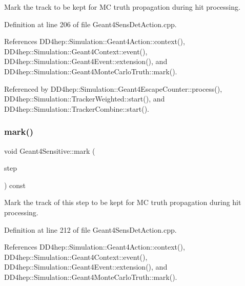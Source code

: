 Mark the track to be kept for MC truth propagation during hit processing. 



Definition at line 206 of file Geant4\+Sens\+Det\+Action.\+cpp.



References D\+D4hep\+::\+Simulation\+::\+Geant4\+Action\+::context(), D\+D4hep\+::\+Simulation\+::\+Geant4\+Context\+::event(), D\+D4hep\+::\+Simulation\+::\+Geant4\+Event\+::extension(), and D\+D4hep\+::\+Simulation\+::\+Geant4\+Monte\+Carlo\+Truth\+::mark().



Referenced by D\+D4hep\+::\+Simulation\+::\+Geant4\+Escape\+Counter\+::process(), D\+D4hep\+::\+Simulation\+::\+Tracker\+Weighted\+::start(), and D\+D4hep\+::\+Simulation\+::\+Tracker\+Combine\+::start().

\hypertarget{class_d_d4hep_1_1_simulation_1_1_geant4_sensitive_a3a5b62f53f7a9c9a07910716cc85e3aa}{}\label{class_d_d4hep_1_1_simulation_1_1_geant4_sensitive_a3a5b62f53f7a9c9a07910716cc85e3aa} 
\subsubsection{\texorpdfstring{mark()}{mark()}\hspace{0.1cm}{\footnotesize\ttfamily [2/2]}}
{\footnotesize\ttfamily void Geant4\+Sensitive\+::mark (\begin{DoxyParamCaption}\item[{const G4\+Step $\ast$}]{step }\end{DoxyParamCaption}) const}



Mark the track of this step to be kept for MC truth propagation during hit processing. 



Definition at line 212 of file Geant4\+Sens\+Det\+Action.\+cpp.



References D\+D4hep\+::\+Simulation\+::\+Geant4\+Action\+::context(), D\+D4hep\+::\+Simulation\+::\+Geant4\+Context\+::event(), D\+D4hep\+::\+Simulation\+::\+Geant4\+Event\+::extension(), and D\+D4hep\+::\+Simulation\+::\+Geant4\+Monte\+Carlo\+Truth\+::mark().

\hypertarget{class_d_d4hep_1_1_simulation_1_1_geant4_sensitive_aafeedad27312aba2b09303bf822bd93e}{}\label{class_d_d4hep_1_1_simulation_1_1_geant4_sensitive_aafeedad27312aba2b09303bf822bd93e} 

